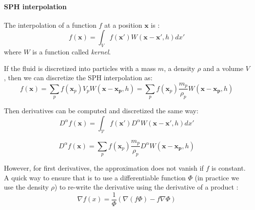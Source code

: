 \documentclass[11pt, oneside, a4paper]{memoir}
\begin{document}
\paragraph{SPH interpolation}
The interpolation of a function $f$ at a position $\mathbf{x}$ is :
\begin{equation}
f(\mathbf{x}) = \int_{V} f(\mathbf{x'})W(\mathbf{x}-\mathbf{x'}, h)dx'
\end{equation}
where $W$ is a function called \emph{kernel}. 

If the fluid is discretized into particles with a mass $m$, a density $\rho$ and a volume $V$, then we can discretize the SPH interpolation as:
\begin{equation}
f(\mathbf{x}) = \sum_{p} f(\mathbf{x}_{p})V_{p} W(\mathbf{x}-\mathbf{x_{p}},h) = \sum_{p} f(\mathbf{x}_{p})\frac{m_{p}}{\rho_{p}} W(\mathbf{x}-\mathbf{x_{p}},h)
\end{equation}

Then derivatives can be computed and discretized the same way:
\begin{equation}
D^{\alpha} f(\mathbf{x}) = \int_{\mathcal{V}} f(\mathbf{x'}) D^{\alpha} W(\mathbf{x}-\mathbf{x'}, h)dx'
\end{equation}

\begin{equation}
D^{\alpha} f(\mathbf{x})= \sum_{p} f(\mathbf{x}_{p})\frac{m_{p}}{\rho_{p}} D^{\alpha} W(\mathbf{x}-\mathbf{x_{p}},h)
\end{equation}

However, for first derivatives, the approximation does not vanish if $f$ is constant. A quick way to ensure that is to use a differentiable function $\Phi$ (in practice we use the density $\rho$) to re-write the derivative using the derivative of a product :
\begin{equation}
\nabla f(x) = \frac{1}{\Phi}\left(\nabla (f \Phi) - f \nabla \Phi \right)
\end{equation}
\end{document}
